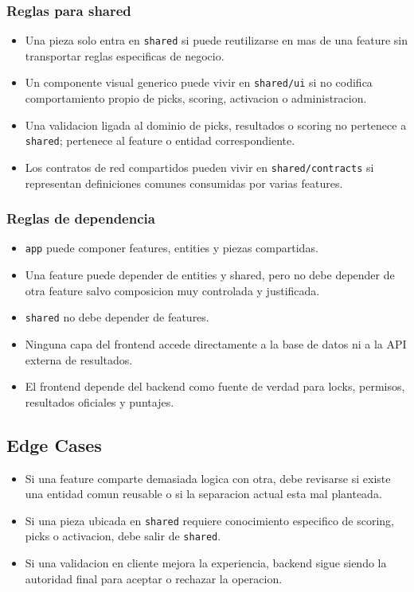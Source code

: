 \subsubsection{Reglas para shared}

\begin{itemize}
  \item Una pieza solo entra en \texttt{shared} si puede reutilizarse en mas de una feature sin transportar reglas especificas de negocio.
  \item Un componente visual generico puede vivir en \texttt{shared/ui} si no codifica comportamiento propio de picks, scoring, activacion o administracion.
  \item Una validacion ligada al dominio de picks, resultados o scoring no pertenece a \texttt{shared}; pertenece al feature o entidad correspondiente.
  \item Los contratos de red compartidos pueden vivir en \texttt{shared/contracts} si representan definiciones comunes consumidas por varias features.
\end{itemize}

\subsubsection{Reglas de dependencia}

\begin{itemize}
  \item \texttt{app} puede componer features, entities y piezas compartidas.
  \item Una feature puede depender de entities y shared, pero no debe depender de otra feature salvo composicion muy controlada y justificada.
  \item \texttt{shared} no debe depender de features.
  \item Ninguna capa del frontend accede directamente a la base de datos ni a la API externa de resultados.
  \item El frontend depende del backend como fuente de verdad para locks, permisos, resultados oficiales y puntajes.
\end{itemize}

\subsection{Edge Cases}

\begin{itemize}
  \item Si una feature comparte demasiada logica con otra, debe revisarse si existe una entidad comun reusable o si la separacion actual esta mal planteada.
  \item Si una pieza ubicada en \texttt{shared} requiere conocimiento especifico de scoring, picks o activacion, debe salir de \texttt{shared}.
  \item Si una validacion en cliente mejora la experiencia, backend sigue siendo la autoridad final para aceptar o rechazar la operacion.
\end{itemize}

